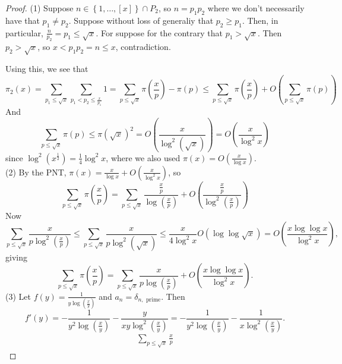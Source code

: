 \documentclass[reqno]{amsart}
\theoremstyle{definition}
\theoremstyle{remark}
\begin{document}
\begin{proof}
    (1) Suppose
    $n \in \left\{ 1, \ldots, \left[ x \right]  \right\} 
    \cap P_2$, so
    $n = p_1 p_2$ where we don't necessarily have
    that $p_1 \neq p_2$. Suppose without loss of generaliy
    that $p_2 \ge p_1$. Then, in particular,
    $\frac{n}{p_2} = p_1 \le \sqrt{x} $.
    For suppose for the contrary that
    $p_1 > \sqrt{x} $. Then
    $p_2 > \sqrt{x} $, so
    $x < p_1p_2 = n \le x$, contradiction. 

    Using this, we see that
    \[
    \pi_2 (x) = 
    \sum_{p_1 \le \sqrt{x}}
    \sum_{p_1 < p_2 \le \frac{x}{p_1}} 1
    =
    \sum_{p \le \sqrt{x} }
    \pi \left(\frac{x}{p} \right) - \pi(p)
    \le  \sum_{p \le \sqrt{x} }
    \pi\left( \frac{x}{p} \right) 
    + O \left( \sum_{p \le \sqrt{x} }
    \pi(p) \right) 
    \] 
    And
    \[
    \sum_{p \le \sqrt{x} }\pi(p)
    \le \pi\left( \sqrt{x}  \right)^2
    = O \left( \frac{x}{\log^2 \left( \sqrt{x}  \right) } \right) 
    = O \left( \frac{x}{\log^2 x} \right) 
    \] 
    since $\log^2 \left( x^{\frac{1}{2}} \right) 
    = \frac{1}{4} \log^2 x$, where
    we also used $\pi(x) = O \left( \frac{x}{\log x} \right) $.\\
    \linebreak
    (2) 
    By the PNT, 
    $\pi(x) = \frac{x}{\log x} + O\left( \frac{x}{\log^2 x} \right) $,
    so
    \[
    \sum_{p \le \sqrt{x} } \pi \left( \frac{x}{p} \right) 
    = \sum_{p \le \sqrt{x} } 
    \frac{\frac{x}{p}}{\log \left( \frac{x}{p} \right) }
    + O \left( \frac{\frac{x}{p}}{\log^2 \left( \frac{x}{p}
    \right) } \right) 
    \] 
    Now
    \[
    \sum_{p\le \sqrt{x} }
    \frac{x}{p \log^2 \left( \frac{x}{p} \right) }
    \le 
    \sum_{p\le \sqrt{x} }
    \frac{x}{p \log^2 \left( \sqrt{x}  \right) }
    \le \frac{x}{4 \log^2 x} O \left( \log \log \sqrt{x}  \right) 
    = O \left( \frac{x \log \log x}{\log^2 x} \right),
    \] 
    giving
    \[
    \sum_{p \le \sqrt{x} }\pi\left(\frac{x}{p}\right)
    =
    \sum_{p\le \sqrt{x} } \frac{x}{p \log\left( \frac{x}{p} \right) }
    + O \left( \frac{x \log \log x}{\log^2 x} \right).
    \] 
    (3) 
    Let
    $f(y) = \frac{1}{y \log(\frac{x}{y})}$ and
    $a_n = \delta_{n, \text{ prime}}$.
    Then
    \[
    f'(y) = - \frac{1}{y^2 \log\left( \frac{x}{y} \right) }
    - \frac{y}{xy \log^2 \left( \frac{x}{y} \right) }
    =- \frac{1 }{y^2 \log \left( \frac{x}{y} \right) }
    - \frac{1}{x \log^2 \left( \frac{x}{y} \right) }.
    \] 
    \begin{align*}
        \sum_{p\le \sqrt{x} } \frac{x}{p
}
\end{align*}
\end{proof}
\end{document}
